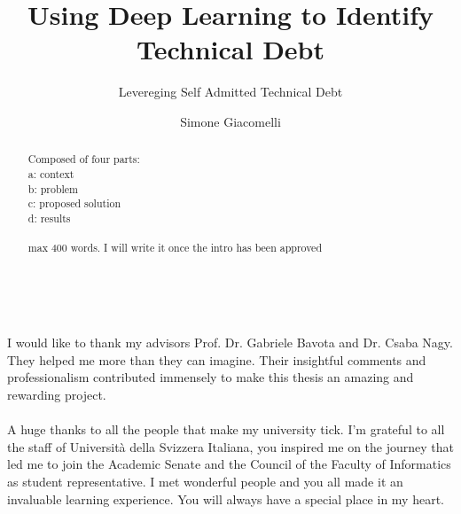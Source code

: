 \documentclass[11pt, mscthesis]{usiinfthesis}
\title{Using Deep Learning to Identify Technical Debt} %
\subtitle{Levereging Self Admitted Technical Debt} %
\author{Simone Giacomelli} %
\begin{document}
\maketitle %

\frontmatter %

\begin{abstract}
Composed of four parts: \\
a: context\\
b: problem\\
c: proposed solution\\
d: results\\
\\
max 400 words.
I will write it once the intro has been approved
\\
\\
\\

\end{abstract}


\begin{acknowledgements}
I would like to thank my advisors Prof. Dr. Gabriele Bavota and Dr. Csaba Nagy. They helped me more than they can imagine. Their insightful comments and professionalism contributed immensely to make this thesis an amazing and rewarding project.
\\
\\
A huge thanks to all the people that make my university tick. I'm grateful to all the staff of Universit\`a della Svizzera Italiana, you inspired me on the journey that led me to join the Academic Senate and the Council of the Faculty of Informatics as student representative. I met wonderful people and you all made it an invaluable learning experience. You will always have a special place in my heart.



\end{acknowledgements}

\tableofcontents 
\listoffigures %
\listoftables %

\mainmatter










\appendix


\end{document}
